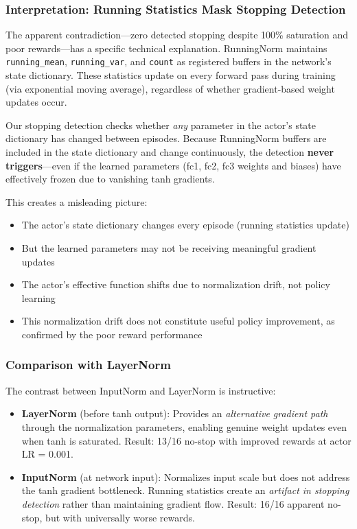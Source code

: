 \subsubsection{Interpretation: Running Statistics Mask Stopping Detection}

The apparent contradiction---zero detected stopping despite 100\% saturation and poor rewards---has a specific technical explanation. RunningNorm maintains \texttt{running\_mean}, \texttt{running\_var}, and \texttt{count} as registered buffers in the network's state dictionary. These statistics update on every forward pass during training (via exponential moving average), regardless of whether gradient-based weight updates occur.

Our stopping detection checks whether \textit{any} parameter in the actor's state dictionary has changed between episodes. Because RunningNorm buffers are included in the state dictionary and change continuously, the detection \textbf{never triggers}---even if the learned parameters (fc1, fc2, fc3 weights and biases) have effectively frozen due to vanishing tanh gradients.

This creates a misleading picture:
\begin{itemize}
    \item The actor's state dictionary changes every episode (running statistics update)
    \item But the learned parameters may not be receiving meaningful gradient updates
    \item The actor's effective function shifts due to normalization drift, not policy learning
    \item This normalization drift does not constitute useful policy improvement, as confirmed by the poor reward performance
\end{itemize}

\subsubsection{Comparison with LayerNorm}

The contrast between InputNorm and LayerNorm is instructive:

\begin{itemize}
    \item \textbf{LayerNorm} (before tanh output): Provides an \textit{alternative gradient path} through the normalization parameters, enabling genuine weight updates even when tanh is saturated. Result: 13/16 no-stop with improved rewards at actor LR = 0.001.

    \item \textbf{InputNorm} (at network input): Normalizes input scale but does not address the tanh gradient bottleneck. Running statistics create an \textit{artifact in stopping detection} rather than maintaining gradient flow. Result: 16/16 apparent no-stop, but with universally worse rewards.
\end{itemize}

